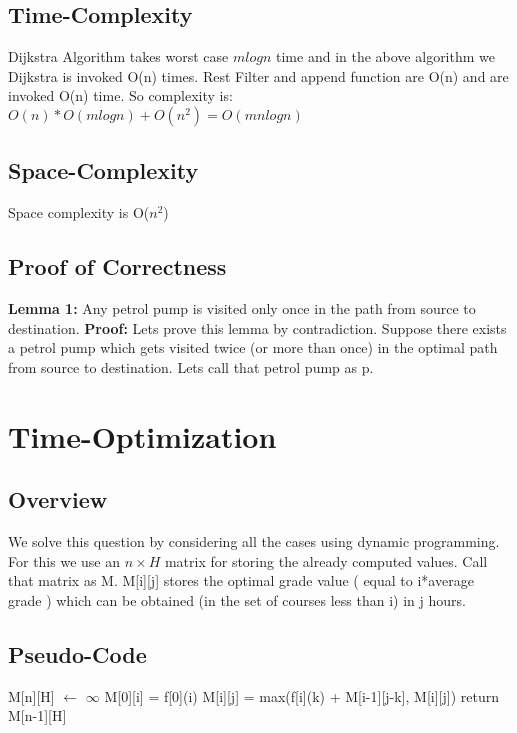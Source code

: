 \documentclass{article}
\begin{document}
\subsection{Time-Complexity}
Dijkstra Algorithm takes worst case $mlogn$ time and in the above algorithm we Dijkstra is invoked O(n) times. 
Rest Filter and append function are O(n) and are invoked O(n) time. So complexity is: \\
\hspace*{1.5cm}$O(n)*O(mlogn) + O(n^2) = O(mnlogn)$

\subsection{Space-Complexity}
Space complexity is O($n^2$)

\subsection{Proof of Correctness}
\textbf{Lemma 1:} Any petrol pump is visited only once in the path from source to destination.
\textbf{Proof:} Lets prove this lemma by contradiction. Suppose there exists a petrol pump which gets visited twice (or more than once)
in the optimal path from source to destination. Lets call that petrol pump as p.

\newpage
\section{Time-Optimization}
\subsection{Overview}
We solve this question by considering all the cases using dynamic programming. For this we use an $n\times H$ matrix for storing the already computed
values. Call that matrix as M.
M[i][j] stores the optimal grade value ( equal to i*average grade ) which can be obtained (in the set of courses less than i) in j hours. 

\subsection{Pseudo-Code}
\begin{algorithmic}[1]
  \State M[n][H] $\gets$ $\infty$
  \State M[0][i] = f[0](i) 
  \EndFor
  \State M[i][j] = max(f[i](k) + M[i-1][j-k], M[i][j]) 
  \EndFor
  \EndFor
  \EndFor
  \State return M[n-1][H] 
  \EndProcedure 
\end{algorithmic}
\end{document}
